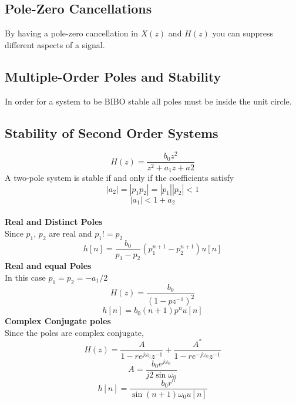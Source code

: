 \documentclass{article} %
\begin{document}
	\subsection{Pole-Zero Cancellations}
	By having a pole-zero cancellation in $X(z)$ and $H(z)$ you can suppress different aspects of a signal.
	
	\subsection{Multiple-Order Poles and Stability}
	In order for a system to be BIBO stable all poles must be inside the unit circle.
	
	\subsection{Stability of Second Order Systems}
	\begin{equation}
	H(z) = \frac{b_0z^2}{z^2+a_1z+a2}
	\end{equation}
	A two-pole system is stable if and only if the coefficients satisfy
	\begin{equation}
	|a_2| = |p_1p_2| = |p_1||p_2| < 1
	\end{equation}
	\begin{equation}
	|a_1| < 1 + a_2
	\end{equation}\\
	\textbf{Real and Distinct Poles}\\
	Since $p_1$, $p_2$ are real and $p_1 != p_2$
	\begin{equation}
	h[n] = \frac{b_0}{p_1-p_2}(p_1^{n+1}-p_2^{n+1})u[n]
	\end{equation}
	\textbf{Real and equal Poles}\\
	In this case $p_1 = p_2 = -a_1/2$
	\begin{equation}
	H(z) = \frac{b_0}{(1-pz^{-1})^2}
	\end{equation}
	\begin{equation}
	h[n] = b_0(n+1)p^nu[n]
	\end{equation}
	\textbf{Complex Conjugate poles}\\
	Since the poles are complex conjugate,
	\begin{equation}
	H(z) = \frac{A}{1-re^{j\omega_0}z^{-1}} + \frac{A^*}{1-re^{-j\omega_0}z^{-1}}
	\end{equation}
	\begin{equation}
	A = \frac{b_0 e^{j\omega_0}}{j2\sin \omega_0}
	\end{equation}
	\begin{equation}
	h[n] = \frac{b_0 r^n}{\sin(n+1)\omega_0u[n]}
	\end{equation}
	
\end{document}
